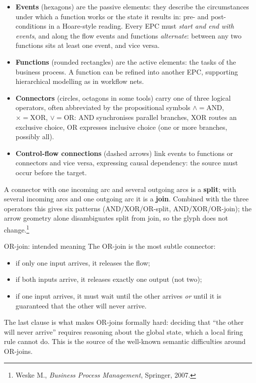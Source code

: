 \begin{itemize}
  \item \textbf{Events} (hexagons) are the passive elements: they describe the circumstances under which a function works or the state it results in: pre- and post-conditions in a Hoare-style reading. Every EPC must \emph{start and end with events}, and along the flow events and functions \emph{alternate}: between any two functions sits at least one event, and vice versa.
  \item \textbf{Functions} (rounded rectangles) are the active elements: the tasks of the business process. A function can be refined into another EPC, supporting hierarchical modelling as in workflow nets.
  \item \textbf{Connectors} (circles, octagons in some tools) carry one of three logical operators, often abbreviated by the propositional symbols $\wedge = \mathrm{AND}$, $\times = \mathrm{XOR}$, $\vee = \mathrm{OR}$: AND synchronises parallel branches, XOR routes an exclusive choice, OR expresses inclusive choice (one or more branches, possibly all).
  \item \textbf{Control-flow connections} (dashed arrows) link events to functions or connectors and vice versa, expressing causal dependency: the source must occur before the target.
\end{itemize}

A connector with one incoming arc and several outgoing arcs is a \textbf{split}; with several incoming arcs and one outgoing arc it is a \textbf{join}. Combined with the three operators this gives six patterns (AND/XOR/OR-split, AND/XOR/OR-join); the arrow geometry alone disambiguates split from join, so the glyph does not change.\footnote{Weske M., \emph{Business Process Management}, Springer, 2007.}

\begin{notebox}{OR-join: intended meaning}
The OR-join is the most subtle connector:
\begin{itemize}
  \item if only one input arrives, it releases the flow;
  \item if both inputs arrive, it releases exactly one output (not two);
  \item if one input arrives, it must wait until the other arrives \emph{or} until it is guaranteed that the other will never arrive.
\end{itemize}
The last clause is what makes OR-joins formally hard: deciding that ``the other will never arrive'' requires reasoning about the global state, which a local firing rule cannot do. This is the source of the well-known semantic difficulties around OR-joins.
\end{notebox}

